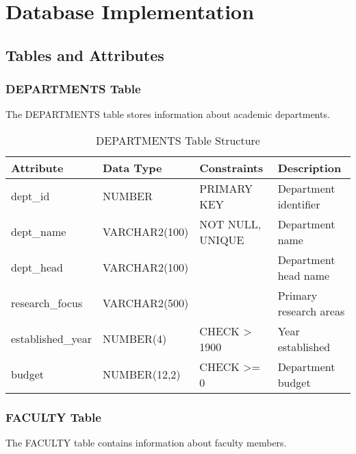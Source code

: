 \documentclass[12pt,a4paper]{article}
\begin{document}
\section{Database Implementation}

\subsection{Tables and Attributes}

\subsubsection{DEPARTMENTS Table}
The DEPARTMENTS table stores information about academic departments.

\begin{table}[H]
\centering
\begin{tabular}{|l|l|l|l|}
\hline
\textbf{Attribute} & \textbf{Data Type} & \textbf{Constraints} & \textbf{Description} \\
\hline
dept\_id & NUMBER & PRIMARY KEY & Department identifier \\
dept\_name & VARCHAR2(100) & NOT NULL, UNIQUE & Department name \\
dept\_head & VARCHAR2(100) & & Department head name \\
research\_focus & VARCHAR2(500) & & Primary research areas \\
established\_year & NUMBER(4) & CHECK > 1900 & Year established \\
budget & NUMBER(12,2) & CHECK >= 0 & Department budget \\
\hline
\end{tabular}
\caption{DEPARTMENTS Table Structure}
\end{table}

\subsubsection{FACULTY Table}
The FACULTY table contains information about faculty members.
\end{document}
